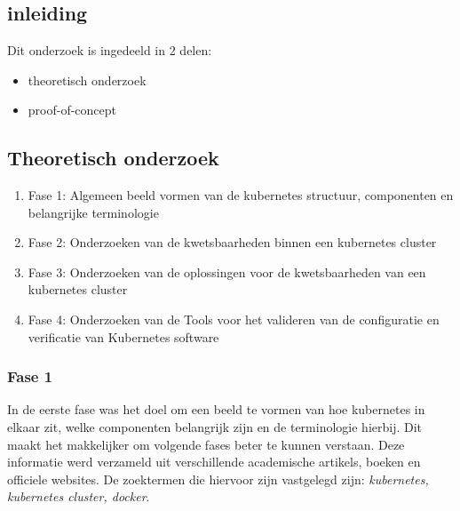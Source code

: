 
\chapter{}%
\label{ch:methodologie}

\section{inleiding}

Dit onderzoek is ingedeeld in 2 delen:
\begin{itemize}
    \item theoretisch onderzoek
    \item proof-of-concept
\end{itemize}

\section{Theoretisch onderzoek}

\begin{enumerate}
    \item Fase 1: Algemeen beeld vormen van de kubernetes structuur, componenten en belangrijke terminologie
    \item Fase 2: Onderzoeken van de kwetsbaarheden binnen een kubernetes cluster
    \item Fase 3: Onderzoeken van de oplossingen voor de kwetsbaarheden van een kubernetes cluster
    \item Fase 4: Onderzoeken van de Tools voor het valideren van de configuratie en verificatie van Kubernetes software
\end{enumerate}

\subsection{Fase 1}
In de eerste fase was het doel om een beeld te vormen van hoe kubernetes in elkaar zit, welke componenten belangrijk zijn en de terminologie hierbij.
Dit maakt het makkelijker om volgende fases beter te kunnen verstaan. Deze informatie werd verzameld uit verschillende academische artikels, boeken en officiele websites.
De zoektermen die hiervoor zijn vastgelegd zijn: \textit{kubernetes, kubernetes cluster, docker}. 


